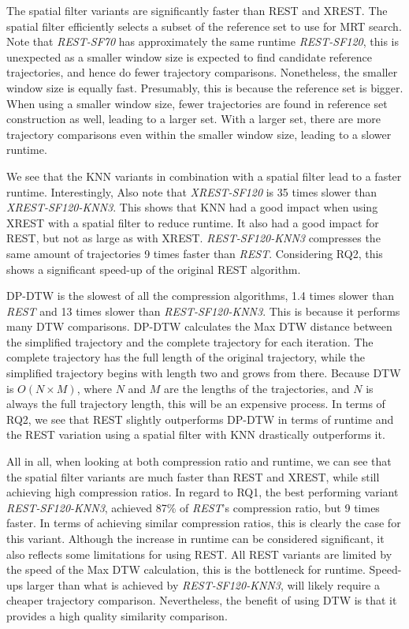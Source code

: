 The spatial filter variants are significantly faster than REST and XREST. The spatial filter efficiently selects a subset of the reference set to use for MRT search. Note that \textit{REST-SF70} has approximately the same runtime \textit{REST-SF120}, this is unexpected as a smaller window size is expected to find candidate reference trajectories, and hence do fewer trajectory comparisons. Nonetheless, the smaller window size is equally fast. Presumably, this is because the reference set is bigger. When using a smaller window size, fewer trajectories are found in reference set construction as well, leading to a larger set. With a larger set, there are more trajectory comparisons even within the smaller window size, leading to a slower runtime.

We see that the KNN variants in combination with a spatial filter lead to a faster runtime. Interestingly, Also note that \textit{XREST-SF120} is 35 times slower than \textit{XREST-SF120-KNN3}. This shows that KNN had a good impact when using XREST with a spatial filter to reduce runtime. It also had a good impact for REST, but not as large as with XREST. \textit{REST-SF120-KNN3} compresses the same amount of trajectories 9 times faster than \textit{REST}. Considering RQ2, this shows a significant speed-up of the original REST algorithm.

DP-DTW is the slowest of all the compression algorithms, 1.4 times slower than \textit{REST} and 13 times slower than \textit{REST-SF120-KNN3}. This is because it performs many DTW comparisons. DP-DTW calculates the Max DTW distance between the simplified trajectory and the complete trajectory for each iteration. The complete trajectory has the full length of the original trajectory, while the simplified trajectory begins with length two and grows from there. Because DTW is $O(N \times M)$, where $N$ and $M$ are the lengths of the trajectories, and $N$ is always the full trajectory length, this will be an expensive process. In terms of RQ2, we see that REST slightly outperforms DP-DTW in terms of runtime and the REST variation using a spatial filter with KNN drastically outperforms it.

All in all, when looking at both compression ratio and runtime, we can see that the spatial filter variants are much faster than REST and XREST, while still achieving high compression ratios. In regard to RQ1, the best performing variant \textit{REST-SF120-KNN3}, achieved 87\% of \textit{REST}'s compression ratio, but 9 times faster. In terms of achieving similar compression ratios, this is clearly the case for this variant. Although the increase in runtime can be considered significant, it also reflects some limitations for using REST. All REST variants are limited by the speed of the Max DTW calculation, this is the bottleneck for runtime. Speed-ups larger than what is achieved by \textit{REST-SF120-KNN3}, will likely require a cheaper trajectory comparison. Nevertheless, the benefit of using DTW is that it provides a high quality similarity comparison.

